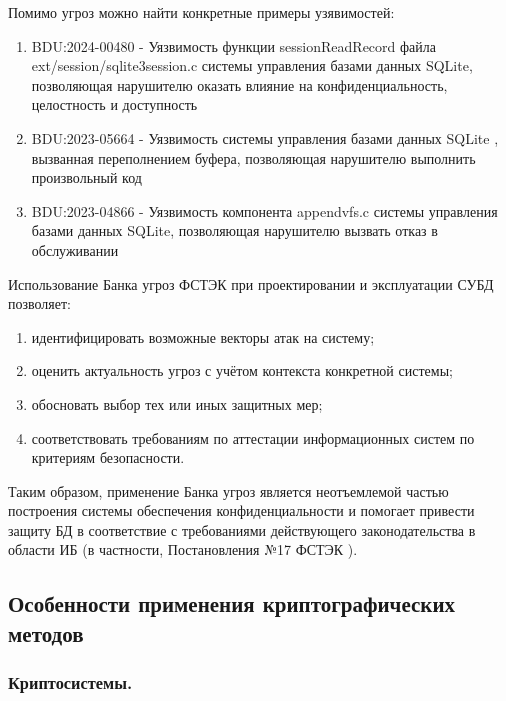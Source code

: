 Помимо угроз можно найти конкретные примеры узявимостей:

\begin{enumerate}
    \item BDU:2024-00480 - Уязвимость функции sessionReadRecord файла ext/session/sqlite3session.c системы управления базами данных SQLite, позволяющая нарушителю оказать влияние на конфиденциальность, целостность и доступность
    \item BDU:2023-05664 - Уязвимость системы управления базами данных SQLite , вызванная переполнением буфера, позволяющая нарушителю выполнить произвольный код
    \item BDU:2023-04866 - Уязвимость компонента appendvfs.c системы управления базами данных SQLite, позволяющая нарушителю вызвать отказ в обслуживании
\end{enumerate}

Использование Банка угроз ФСТЭК при проектировании и эксплуатации СУБД позволяет:

\begin{enumerate}

    \item идентифицировать возможные векторы атак на систему;
    \item оценить актуальность угроз с учётом контекста конкретной системы;
    \item обосновать выбор тех или иных защитных мер;
    \item соответствовать требованиям по аттестации информационных систем по критериям безопасности.

\end{enumerate}
Таким образом, применение Банка угроз является неотъемлемой частью построения системы обеспечения конфиденциальности и помогает привести защиту БД в соответствие с требованиями действующего законодательства в области ИБ (в частности, Постановления №17 ФСТЭК \cite{fstec17}).

\subsection{Особенности применения криптографических методов}
\subsubsection{Криптосистемы.}


